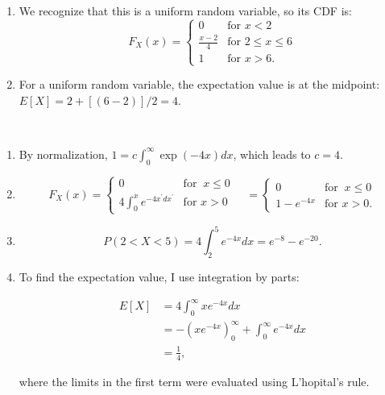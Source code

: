 \begin{problem}{1}  $ $
\begin{enumerate}
\item
We recognize that this is a uniform random variable, so its CDF is:
\[
  F_X(x) =
  \begin{cases}
                                   0 & \text{for $x < 2$} \\
                                   \frac{x-2}{4} & \text{for $2 \le x \le 6$} \\
 1 & \text{for $x>6$}.
  \end{cases}
\]

\item
For a uniform random variable, the expectation value is at the midpoint: $E[X] = 2+[(6-2)]/2 = 4$.


\end{enumerate}
\end{problem}

\begin{problem}{2}  $ $
\begin{enumerate}

\item By normalization, $1 = c \int_0^\infty \exp{(-4x)}dx$, which leads to $c=4$. 

\item
\begin{equation*}  
  F_X(x) = \begin{cases}
                                   0 & \text{for $~x \le 0$} \\
                                   4\int_0^x e^{-4 x^\prime dx^\prime} & \text{for  $x>0$} 
       \end{cases} \quad
= \begin{cases}
                                   0 & \text{for $~x \le 0$} \\
                                   1 - e^{-4 x} & \text{for  $x>0$}.
       \end{cases}
\end{equation*}

\item

\begin{equation*}
P(2 < X < 5) = 4 \int_2^5 e^{-4x}dx = e^{-8}-e^{-20}.
\end{equation*}

\item
To find the expectation value, I use integration by parts:

\begin{align*}
E[X] &= 4\int_0^\infty x e^{-4x}dx \\
& = -\left(x e^{-4x} \right)_0^\infty +\int_0^\infty e^{-4x}dx \\
& = \frac{1}{4},
\end{align*}

where the limits in the first term were evaluated using L'hopital's rule.

\end{enumerate}
\end{problem}

